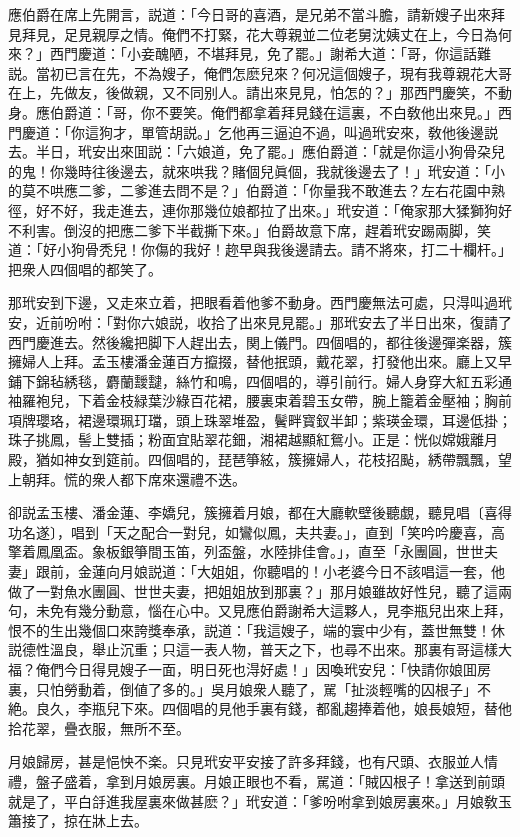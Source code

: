 應伯爵在席上先開言，説道：「今日哥的喜酒，是兄弟不當斗膽，請新嫂子出來拜見拜見，足見親厚之情。俺們不打緊，花大尊親並二位老舅沈姨丈在上，今日為何來？」西門慶道：「小妾醜陋，不堪拜見，免了罷。」謝希大道：「哥，你這話難説。當初已言在先，不為嫂子，俺們怎麽兒來？何况這個嫂子，現有我尊親花大哥在上，先做友，後做親，又不同别人。請出來見見，怕怎的？」那西門慶笑，不動身。應伯爵道：「哥，你不要笑。俺們都拿着拜見錢在這裏，不白敎他出來見。」西門慶道：「你這狗才，單管胡説。」乞他再三逼迫不過，叫過玳安來，敎他後邊説去。半日，玳安出來囬説：「六娘道，免了罷。」應伯爵道：「就是你這小狗骨朶兒的鬼！你幾時往後邊去，就來哄我？賭個兒眞個，我就後邊去了！」玳安道：「小的莫不哄應二爹，二爹進去問不是？」伯爵道：「你量我不敢進去？左右花園中熟徑，好不好，我走進去，連你那幾位娘都拉了出來。」玳安道：「俺家那大猱獅狗好不利害。倒沒的把應二爹下半截撕下來。」伯爵故意下席，趕着玳安踢兩脚，笑道：「好小狗骨秃兒！你傷的我好！趂早與我後邊請去。請不將來，打二十欄杆。」把衆人四個唱的都笑了。

那玳安到下邊，又走來立着，把眼看着他爹不動身。西門慶無法可處，只淂叫過玳安，近前吩咐：「對你六娘説，收拾了出來見見罷。」那玳安去了半日出來，復請了西門慶進去。然後纔把脚下人趕出去，関上儀門。四個唱的，都往後邊彈楽器，簇擁婦人上拜。孟玉樓潘金蓮百方攛掇，替他抿頭，戴花翠，打發他出來。廳上又早鋪下錦毡綉毯，麝蘭靉靆，絲竹和鳴，四個唱的，導引前行。婦人身穿大紅五彩通袖羅袍兒，下着金枝緑葉沙綠百花裙，腰裏束着碧玉女帶，腕上籠着金壓袖；胸前項牌瓔珞，裙邊環珮玎璫，頭上珠翠堆盈，鬢畔寳釵半卸；紫瑛金環，耳邊低掛；珠子挑鳳，髻上雙插；粉面宜貼翠花鈿，湘裙越顯紅鴛小。正是：恍似嫦娥離月殿，猶如神女到筵前。四個唱的，琵琶箏絃，簇擁婦人，花枝招颭，綉帶飄飄，望上朝拜。慌的衆人都下席來還禮不迭。

卻説孟玉樓、潘金蓮、李嬌兒，簇擁着月娘，都在大廳軟壁後聽覷，聽見唱〔喜得功名遂〕，唱到「天之配合一對兒，如鸞似鳳，夫共妻。」，直到「笑吟吟慶喜，高擎着鳳凰盃。象板銀箏間玉笛，列盃盤，水陸排佳會。」，直至「永團圓，世世夫妻」跟前，金蓮向月娘説道：「大姐姐，你聽唱的！小老婆今日不該唱這一套，他做了一對魚水團圓、世世夫妻，把姐姐放到那裏？」那月娘雖故好性兒，聽了這兩句，未免有幾分動意，惱在心中。又見應伯爵謝希大這夥人，見李瓶兒出來上拜，恨不的生出幾個口來誇獎奉承，説道：「我這嫂子，端的寰中少有，蓋世無雙！休説德性溫良，舉止沉重；只這一表人物，普天之下，也尋不出來。那裏有哥這樣大福？俺們今日得見嫂子一面，明日死也淂好處！」因喚玳安兒：「快請你娘囬房裏，只怕勞動着，倒値了多的。」吳月娘衆人聽了，駡「扯淡輕嘴的囚根子」不絶。良久，李瓶兒下來。四個唱的見他手裏有錢，都亂趨捧着他，娘長娘短，替他拾花翠，疊衣服，無所不至。

月娘歸房，甚是悒怏不楽。只見玳安平安接了許多拜錢，也有尺頭、衣服並人情禮，盤子盛着，拿到月娘房裏。月娘正眼也不看，駡道：「賊囚根子！拿送到前頭就是了，平白㧱進我屋裏來做甚麽？」玳安道：「爹吩咐拿到娘房裏來。」月娘敎玉簫接了，掠在牀上去。


